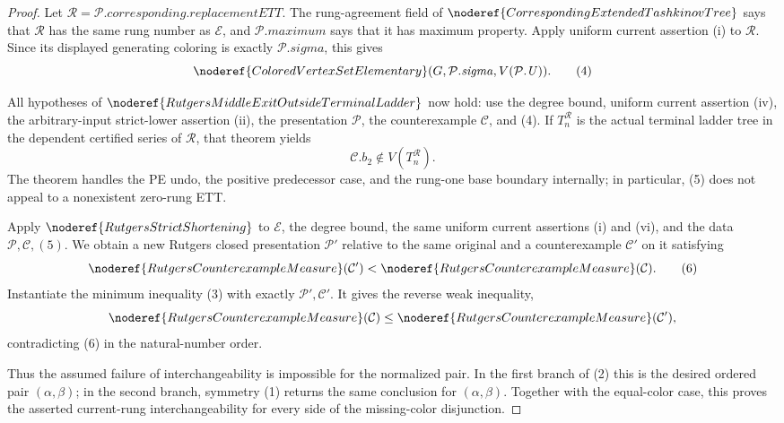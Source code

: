\begin{proof}
Let
\(\mathcal R=\mathcal P.\mathit{corresponding}.\mathit{replacementETT}\).
The rung-agreement field of
\(\noderef{CorrespondingExtendedTashkinovTree}\) says that
\(\mathcal R\) has the same rung number as \(\mathcal E\), and
\(\mathcal P.\mathit{maximum}\) says that it has maximum property.
Apply uniform current assertion (i) to \(\mathcal R\).  Since its
displayed generating coloring is exactly
\(\mathcal P.\mathit{sigma}\), this gives
\[
 \noderef{ColoredVertexSetElementary}
       (G,\mathcal P.\mathit{sigma},V(\mathcal P.\mathit U)). \tag{4}
\]

All hypotheses of
\(\noderef{RutgersMiddleExitOutsideTerminalLadder}\) now hold: use the
degree bound, uniform current assertion (iv), the arbitrary-input
strict-lower assertion (ii), the presentation \(\mathcal P\), the
counterexample \(\mathcal C\), and (4).  If \(T_n^{\mathcal R}\) is
the actual terminal ladder tree in the dependent certified series of
\(\mathcal R\), that theorem yields
\[
                   \mathcal C.b_2\notin V(T_n^{\mathcal R}). \tag{5}
\]
The theorem handles the PE undo, the positive predecessor case, and the
rung-one base boundary internally; in particular, (5) does not appeal to
a nonexistent zero-rung ETT.

Apply \(\noderef{RutgersStrictShortening}\) to \(\mathcal E\), the
degree bound, the same uniform current assertions (i) and (vi), and the
data \(\mathcal P,\mathcal C,(5)\).  We obtain a new Rutgers closed
presentation \(\mathcal P'\) relative to the same original and a
counterexample \(\mathcal C'\) on it satisfying
\[
 \noderef{RutgersCounterexampleMeasure}(\mathcal C')
 <
 \noderef{RutgersCounterexampleMeasure}(\mathcal C).          \tag{6}
\]
Instantiate the minimum inequality (3) with exactly
\(\mathcal P',\mathcal C'\).  It gives the reverse weak inequality,
\[
 \noderef{RutgersCounterexampleMeasure}(\mathcal C)
 \leq
 \noderef{RutgersCounterexampleMeasure}(\mathcal C'),
\]
contradicting (6) in the natural-number order.

Thus the assumed failure of interchangeability is impossible for the
normalized pair.  In the first branch of (2) this is the desired ordered
pair \((\alpha,\beta)\); in the second branch, symmetry (1) returns the
same conclusion for \((\alpha,\beta)\).  Together with the equal-color
case, this proves the asserted current-rung interchangeability for every
side of the missing-color disjunction.
\end{proof}
